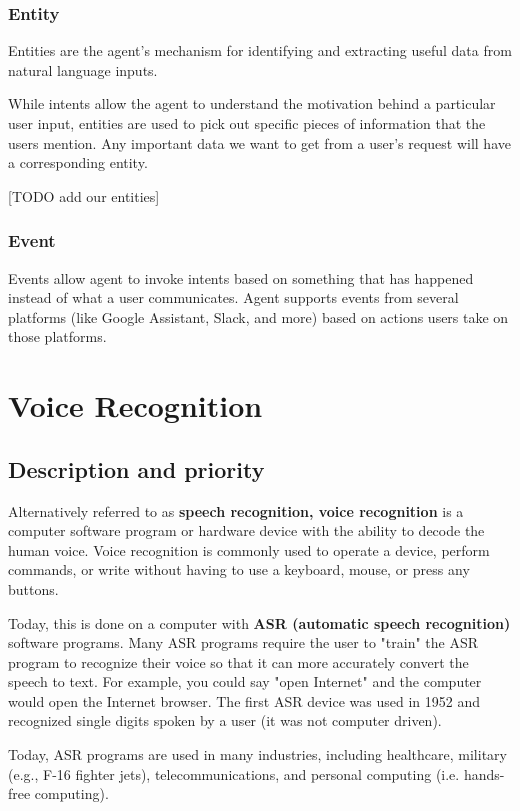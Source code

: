 \documentclass{scrreprt}
\begin{document}
\subsubsection{Entity}
Entities are the agent's mechanism for identifying and extracting useful data from natural language inputs.

While intents allow the agent to understand the motivation behind a particular user input, entities are used to pick out specific pieces of information that the users mention. Any important data we want to get from a user's request will have a corresponding entity.

[TODO add our entities]


\subsubsection{Event}

Events allow agent to invoke intents based on something that has happened instead of what a user communicates. Agent supports events from several platforms (like Google Assistant, Slack, and more) based on actions users take on those platforms.



\newpage
\section{Voice Recognition}




\subsection{Description and priority}
Alternatively referred to as \textbf{speech recognition, voice recognition} is a computer software program or hardware device with the ability to decode the human voice. Voice recognition is commonly used to operate a device, perform commands, or write without having to use a keyboard, mouse, or press any buttons.

Today, this is done on a computer with \textbf{ASR (automatic speech recognition)} software programs. Many ASR programs require the user to "train" the ASR program to recognize their voice so that it can more accurately convert the speech to text. For example, you could say "open Internet" and the computer would open the Internet browser.
The first ASR device was used in 1952 and recognized single digits spoken by a user (it was not computer driven).

Today, ASR programs are used in many industries, including healthcare, military (e.g., F-16 fighter jets), telecommunications, and personal computing (i.e. hands-free computing).
\end{document}
